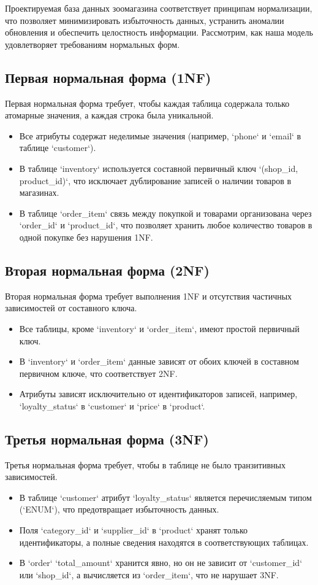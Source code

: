 Проектируемая база данных зоомагазина соответствует принципам нормализации,
что позволяет минимизировать избыточность данных, устранить аномалии обновления и обеспечить целостность информации.
Рассмотрим, как наша модель удовлетворяет требованиям нормальных форм.

\subsection{Первая нормальная форма (1NF)}\label{subsec:1nf}
Первая нормальная форма требует, чтобы каждая таблица содержала только атомарные значения,
а каждая строка была уникальной.
\begin{itemize}
    \item Все атрибуты содержат неделимые значения (например, `phone` и `email` в таблице `customer`).
    \item В таблице `inventory` используется составной первичный ключ `(shop\_id, product\_id)`,
    что исключает дублирование записей о наличии товаров в магазинах.
    \item В таблице `order\_item` связь между покупкой и товарами организована через `order\_id` и `product\_id`,
    что позволяет хранить любое количество товаров в одной покупке без нарушения 1NF\@.
\end{itemize}

\subsection{Вторая нормальная форма (2NF)}\label{subsec:2nf}
Вторая нормальная форма требует выполнения 1NF и отсутствия частичных зависимостей от составного ключа.
\begin{itemize}
    \item Все таблицы, кроме `inventory` и `order\_item`, имеют простой первичный ключ.
    \item В `inventory` и `order\_item` данные зависят от обоих ключей в составном первичном ключе,
    что соответствует 2NF\@.
    \item Атрибуты зависят исключительно от идентификаторов записей, например,
    `loyalty\_status` в `customer` и `price` в `product`.
\end{itemize}

\subsection{Третья нормальная форма (3NF)}\label{subsec:3nf}
Третья нормальная форма требует, чтобы в таблице не было транзитивных зависимостей.
\begin{itemize}
    \item В таблице `customer` атрибут `loyalty\_status` является перечисляемым типом (`ENUM`),
    что предотвращает избыточность данных.
    \item Поля `category\_id` и `supplier\_id` в `product` хранят только идентификаторы,
    а полные сведения находятся в соответствующих таблицах.
    \item В `order` `total\_amount` хранится явно, но он не зависит от `customer\_id` или `shop\_id`,
    а вычисляется из `order\_item`, что не нарушает 3NF\@.
\end{itemize}

